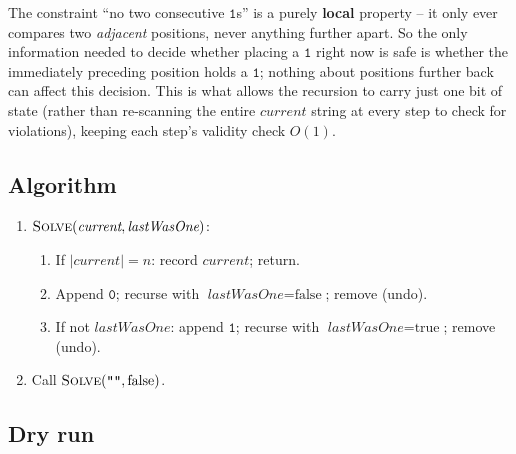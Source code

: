 The constraint ``no two consecutive $\texttt{1}$s'' is a purely
\textbf{local} property -- it only ever compares two \emph{adjacent}
positions, never anything further apart. So the only information needed
to decide whether placing a $\texttt{1}$ right now is safe is whether the
immediately preceding position holds a $\texttt{1}$; nothing about
positions further back can affect this decision. This is what allows the
recursion to carry just one bit of state (rather than re-scanning the
entire $\textit{current}$ string at every step to check for violations),
keeping each step's validity check $O(1)$.

\subsection*{Algorithm}

\begin{enumerate}
  \item $\textsc{Solve}(\textit{current}, \textit{lastWasOne})$:
  \begin{enumerate}
    \item If $|\textit{current}|=n$: record $\textit{current}$; return.
    \item Append $\texttt{0}$; recurse with
          $\textit{lastWasOne}=\text{false}$; remove (undo).
    \item If not $\textit{lastWasOne}$: append $\texttt{1}$; recurse
          with $\textit{lastWasOne}=\text{true}$; remove (undo).
  \end{enumerate}
  \item Call $\textsc{Solve}(\texttt{""}, \text{false})$.
\end{enumerate}

\subsection*{Dry run}


